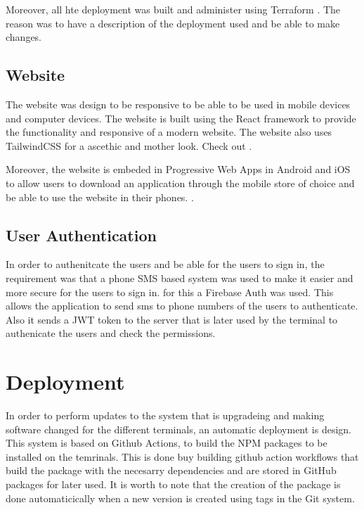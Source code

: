 Moreover, all hte deployment was built and administer using Terraform . The reason was to have a description of the deployment used and be able to make changes.

\subsection{Website}

The website was design to be responsive to be able to be used in mobile devices and computer devices. The website is built using the React framework  to provide the functionality and responsive of a modern website. The website also uses TailwindCSS  for a ascethic and mother look. Check out .

Moreover, the website is embeded in Progressive Web Apps in Android and iOS to allow users to download an application through the mobile store of choice and be able to use the website in their phones. .

\subsection{User Authentication}

In order to authenitcate the users and be able for the users to sign in, the requirement was that a phone SMS based system was used to make it easier and more secure for the users to sign in. for this a Firebase Auth  was used. This allows the application to send sms to phone numbers of the users to authenticate. Also it sends a JWT token to the server that is later used by the terminal to authenicate the users and check the permissions.

\section{Deployment}

In order to perform updates to the system that is upgradeing and making software changed for the different terminals, an automatic deployment is design. This system is based on Github Actions, to build the NPM packages to be installed on the temrinals. This is done buy building github action workflows that build the package with the necesarry dependencies and are stored in GitHub packages for later used. It is worth to note that the creation of the package is done automaticically when a new version is created using tags in the Git system.

